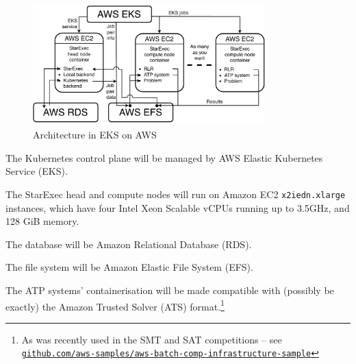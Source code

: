 \documentclass{easychair}
\newenvironment{packed_itemize}{
\vspace*{-0.3em}
\begin{itemize}
\setlength{\partopsep}{0pt}
\setlength{\itemsep}{1pt}
\setlength{\parskip}{0pt}
\setlength{\parsep}{0pt}
}{\end{itemize}}
\newcommand{\dav}[1]{{\color{red}{David: {#1}}}}
\begin{document}
\begin{figure}[htb]
\begin{center}
\includegraphics[width=0.8\textwidth]{ArchitectureAWS}
\caption{Architecture in EKS on AWS}
\label{ArchitectureAWS}
\end{center}
\end{figure}
\begin{packed_itemize}
	
\item The Kubernetes control plane will be managed by AWS Elastic Kubernetes Service (EKS).
\item The StarExec head and compute nodes will run on Amazon EC2 {\tt x2iedn.xlarge} instances,
      which have four Intel Xeon Scalable vCPUs running up to 3.5GHz, and 128 GiB memory.
\item The database will be Amazon Relational Database (RDS).
\item The file system will be Amazon Elastic File System (EFS).
\item The ATP systems' containerisation will be made compatible with (possibly be exactly) the 
      Amazon Trusted Solver (ATS) format.\footnote{%
      As was recently used in the SMT and SAT competitions -- see \\
      \href{https://github.com/aws-samples/aws-batch-comp-infrastructure-sample}
      {\tt github.com/aws-samples/aws-batch-comp-infrastructure-sample}}
\end{packed_itemize}
\end{document}

